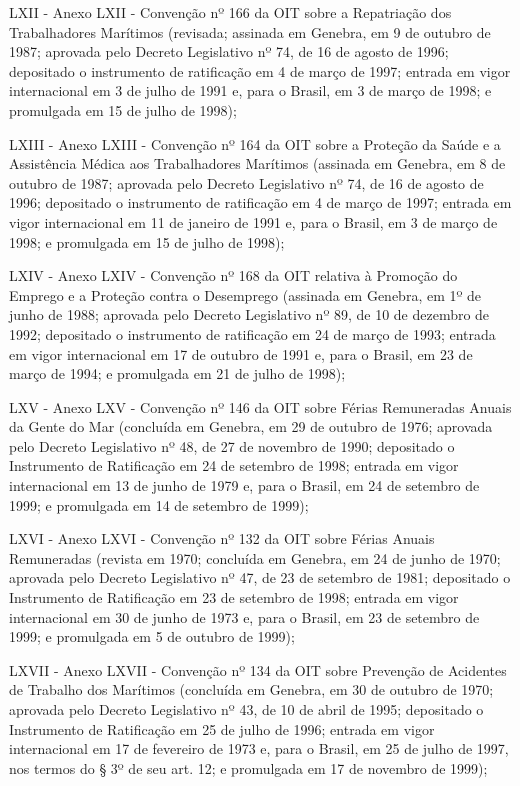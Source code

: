 \documentclass[
]{book}
\begin{document}
LXII - Anexo LXII - Convenção nº 166 da OIT sobre a Repatriação dos Trabalhadores Marítimos (revisada; assinada em Genebra, em 9 de outubro de 1987; aprovada pelo Decreto Legislativo nº 74, de 16 de agosto de 1996; depositado o instrumento de ratificação em 4 de março de 1997; entrada em vigor internacional em 3 de julho de 1991 e, para o Brasil, em 3 de março de 1998; e promulgada em 15 de julho de 1998);

LXIII - Anexo LXIII - Convenção nº 164 da OIT sobre a Proteção da Saúde e a Assistência Médica aos Trabalhadores Marítimos (assinada em Genebra, em 8 de outubro de 1987; aprovada pelo Decreto Legislativo nº 74, de 16 de agosto de 1996; depositado o instrumento de ratificação em 4 de março de 1997; entrada em vigor internacional em 11 de janeiro de 1991 e, para o Brasil, em 3 de março de 1998; e promulgada em 15 de julho de 1998);

LXIV - Anexo LXIV - Convenção nº 168 da OIT relativa à Promoção do Emprego e a Proteção contra o Desemprego (assinada em Genebra, em 1º de junho de 1988; aprovada pelo Decreto Legislativo nº 89, de 10 de dezembro de 1992; depositado o instrumento de ratificação em 24 de março de 1993; entrada em vigor internacional em 17 de outubro de 1991 e, para o Brasil, em 23 de março de 1994; e promulgada em 21 de julho de 1998);

LXV - Anexo LXV - Convenção nº 146 da OIT sobre Férias Remuneradas Anuais da Gente do Mar (concluída em Genebra, em 29 de outubro de 1976; aprovada pelo Decreto Legislativo nº 48, de 27 de novembro de 1990; depositado o Instrumento de Ratificação em 24 de setembro de 1998; entrada em vigor internacional em 13 de junho de 1979 e, para o Brasil, em 24 de setembro de 1999; e promulgada em 14 de setembro de 1999);

LXVI - Anexo LXVI - Convenção nº 132 da OIT sobre Férias Anuais Remuneradas (revista em 1970; concluída em Genebra, em 24 de junho de 1970; aprovada pelo Decreto Legislativo nº 47, de 23 de setembro de 1981; depositado o Instrumento de Ratificação em 23 de setembro de 1998; entrada em vigor internacional em 30 de junho de 1973 e, para o Brasil, em 23 de setembro de 1999; e promulgada em 5 de outubro de 1999);

LXVII - Anexo LXVII - Convenção nº 134 da OIT sobre Prevenção de Acidentes de Trabalho dos Marítimos (concluída em Genebra, em 30 de outubro de 1970; aprovada pelo Decreto Legislativo nº 43, de 10 de abril de 1995; depositado o Instrumento de Ratificação em 25 de julho de 1996; entrada em vigor internacional em 17 de fevereiro de 1973 e, para o Brasil, em 25 de julho de 1997, nos termos do § 3º de seu art. 12; e promulgada em 17 de novembro de 1999);
\end{document}
